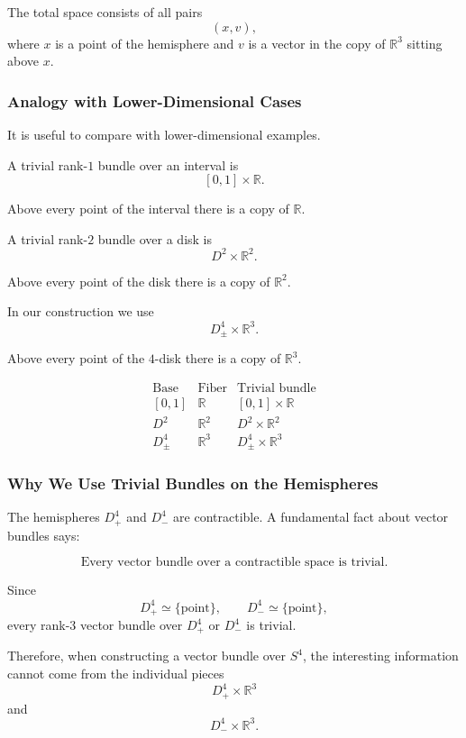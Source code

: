 \documentclass[12pt,a4paper]{article}
\theoremstyle{notespace}
\begin{document}
The total space consists of all pairs
\[
(x,v),
\]
where \(x\) is a point of the hemisphere and \(v\) is a vector in the copy of \(\mathbb R^3\) sitting above \(x\).

\subsubsection{Analogy with Lower-Dimensional Cases}

It is useful to compare with lower-dimensional examples.

A trivial rank-\(1\) bundle over an interval is
\[
[0,1]\times \mathbb R.
\]

Above every point of the interval there is a copy of \(\mathbb R\).

A trivial rank-\(2\) bundle over a disk is
\[
D^2\times \mathbb R^2.
\]

Above every point of the disk there is a copy of \(\mathbb R^2\).

In our construction we use
\[
D^4_\pm\times \mathbb R^3.
\]

Above every point of the \(4\)-disk there is a copy of \(\mathbb R^3\).

\[
\begin{array}{c|c|c}
	\text{Base} & \text{Fiber} & \text{Trivial bundle} \\
	\hline
	[0,1] & \mathbb R & [0,1]\times \mathbb R \\
	D^2 & \mathbb R^2 & D^2\times \mathbb R^2 \\
	D^4_\pm & \mathbb R^3 & D^4_\pm\times \mathbb R^3
\end{array}
\]

\subsubsection{Why We Use Trivial Bundles on the Hemispheres}

The hemispheres \(D^4_+\) and \(D^4_-\) are contractible. A fundamental fact about vector bundles says:

\[
\boxed{
	\text{Every vector bundle over a contractible space is trivial.}
}
\]

Since
\[
D^4_+\simeq \{\text{point}\},
\qquad
D^4_-\simeq \{\text{point}\},
\]
every rank-\(3\) vector bundle over \(D^4_+\) or \(D^4_-\) is trivial.

Therefore, when constructing a vector bundle over \(S^4\), the interesting information cannot come from the individual pieces
\[
D^4_+\times \mathbb R^3
\]
and
\[
D^4_-\times \mathbb R^3.
\]
\end{document}
